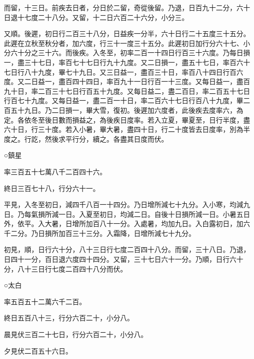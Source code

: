 \begin{pinyinscope}
 而留，十三日。前疾去日者，分日於二留，奇從後留。乃退，日百九十二分，六十日退十七度二十八分。又留，十二日六百二十六分，小分三。



 又順。後遲，初日行二百三十八分，日益疾一分半，六十日行二十五度三十五分。此遲在立秋至秋分者，加六度，行三十一度三十五分。此遲初日加行分六十七、小分六十分之三十六。而後疾。入冬至，初率二百一十四日行百三十六度。乃每日損一，盡三十七日，率百七十七日行九十九度。又二日損一，盡五十七日，率百六十七日行八十九度，畢七十九日。又三日益一，盡百三十日，率百八十四日行百六度。又二日益一，盡百四十四日，率百九十一日行百一十三度。又每日益一，盡百九十日，率二百三十七日行百五十九度。又每日益二，盡二百日，率二百五十七日行百七十九度。又每日益一，盡二百一十日，率二百六十七日行百八十九度，畢二百五十九日。乃二日損一，畢大雪，復初。後遲加六度者，此後疾去度率六，為定。各依冬至後日數而損益之，為後疾日度率。若入立夏，畢夏至，日行半度，盡六十日，行三十度。若入小暑，畢大暑，盡四十日，行二十度皆去日度率，別為半度之。行訖，然後求平行分，續之。各盡其日度而伏。



 ○鎮星



 率三百五十七萬八千二百四十六。



 終日三百七十八，行分六十一。



 平見，入冬至初日，減四千八百一十四分。乃日增所減七十九分。入小寒，均減九日。乃每氣損所減一日。入夏至初日，均減二日。自後十日損所減一日。小暑五日外，依平。入大暑，日增所加百八十一分。入處暑，均加九日。入白露初日，加六千二分。乃日損所加百三十三分。入霜降，日增所減七十九分。



 初見，順，日行六十分，八十三日行七度二百四十八分。而留，三十八日。乃退，日四十一分，百日退六度四十四分。又留，三十七日六十一分。乃順，日行六十分，八十三日行七度二百四十八分而伏。



 ○太白



 率五百五十二萬六千二百。



 終日五百八十三，行分六百二十，小分八。



 晨見伏三百二十七日，行分六百二十，小分八。



 夕見伏二百五十六日。




\end{pinyinscope}
